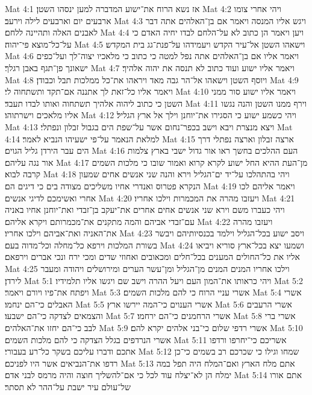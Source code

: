 Mat 4:1  אז נשא הרוח את־ישוע המדברה למען ינסהו השטן׃
Mat 4:2  ויהי אחרי צומו ארבעים יום וארבעים לילה וירעב׃
Mat 4:3  ויגש אליו המנסה ויאמר אם בן־האלהים אתה דבר לאבנים האלה ותהיינה ללחם׃
Mat 4:4  ויען ויאמר הן כתוב לא על־הלחם לבדו יחיה האדם כי על־כל־מוצא פי־יהוה׃
Mat 4:5  וישאהו השטן אל־עיר הקדש ויעמידהו על־פנת־גג בית המקדש׃
Mat 4:6  ויאמר אליו אם בן־האלהים אתה נפל למטה כי כתוב כי מלאכיו יצוה־לך ועל־כפים ישאונך פן־תגף באבן רגלך׃
Mat 4:7  ויאמר אליו ישוע ועוד כתוב לא תנסה את יהוה אלהיך׃
Mat 4:8  ויוסף השטן וישאהו אל־הר גבה מאד ויראהו את־כל ממלכות תבל וכבודן׃
Mat 4:9  ויאמר אליו כל־זאת לך אתננה אם־תקד ותשתחוה לי׃
Mat 4:10  ויאמר אליו ישוע סור ממני השטן כי כתוב ליהוה אלהיך תשתחוה ואותו לבדו תעבד׃
Mat 4:11  וירף ממנו השטן והנה נגשו אליו מלאכים וישרתוהו׃
Mat 4:12  ויהי כשמע ישוע כי הסגירו את־יוחנן וילך אל ארץ הגליל׃
Mat 4:13  ויצא מנצרת ויבא וישב בכפר־נחום אשר על־שפת הים בגבול זבלון ונפתלי׃
Mat 4:14  למלאת הנאמר על־פי ישעיהו הנביא לאמר׃
Mat 4:15  ארצה זבלון וארצה נפתלי דרך הים עבר הירדן גליל הגוים׃
Mat 4:16  העם ההלכים בחשך ראו אור גדול ישבי בארץ צלמות אור נגה עליהם׃
Mat 4:17  מן־העת ההיא החל ישוע לקרא קרוא ואמור שובו כי מלכות השמים קרבה לבוא׃
Mat 4:18  ויהי בהתהלכו על־יד ים־הגליל וירא והנה שני אנשים אחים שמעון הנקרא פטרוס ואנדרי אחיו משליכים מצודה בים כי דיגים הם׃
Mat 4:19  ויאמר אליהם לכו אחרי ואשימכם לדיגי אנשים׃
Mat 4:20  ויעזבו מהרה את המכמרות וילכו אחריו׃
Mat 4:21  ויהי כעברו משם וירא שני אנשים אחים אחרים את־יעקב בן־זבדי ואת־יוחנן אחיו באניה עם־זבדי אביהם והמה מתקנים את־מכמרותם ויקרא אליהם׃
Mat 4:22  ויעזבו מהרה את־האניה ואת־אביהם וילכו אחריו׃
Mat 4:23  ויסב ישוע בכל־הגליל וילמד בכנסיותיהם ויבשר בשורת המלכות וירפא כל־מחלה וכל־מדוה בעם׃
Mat 4:24  ושמעו יצא בכל־ארץ סוריא ויביאו אליו את כל־החולים המענים בכל־חלים ומכאובים ואחוזי שדים ומכי ירח ונכי אברים וירפאם׃
Mat 4:25  וילכו אחריו המנים המנים מן־הגליל ומן־עשר הערים ומירושלים ויהודה ומעבר לירדן׃
Mat 5:1  ויהי כראותו את־המון העם ויעל ההרה וישב שם ויגשו אליו תלמידיו׃
Mat 5:2  ויפתח את־פיו ויורם ויאמר׃
Mat 5:3  אשרי עניי הרוח כי להם מלכות השמים׃
Mat 5:4  אשרי האבלים כי־הם ינחמו׃
Mat 5:5  אשרי הענוים כי־המה יירשו ארץ׃
Mat 5:6  אשרי הרעבים והצמאים לצדקה כי־הם ישבעו׃
Mat 5:7  אשרי הרחמנים כי־הם ירחמו׃
Mat 5:8  אשרי ברי לבב כי־הם יחזו את־האלהים׃
Mat 5:9  אשרי רדפי שלום כי־בני אלהים יקרא להם׃
Mat 5:10  אשרי הנרדפים בגלל הצדקה כי להם מלכות השמים׃
Mat 5:11  אשריכם כי־יחרפו ורדפו אתכם ודברו עליכם בשקר כל־רע בעבורי׃
Mat 5:12  שמחו וגילו כי שכרכם רב בשמים כי־כן רדפו את־הנביאים אשר היו לפניכם׃
Mat 5:13  אתם מלח הארץ ואם־המלח היה תפל במה ימלח הן לא־יצלח עוד לכל כי אם־להשליך חוצה והיה מרמס לבני אדם׃
Mat 5:14  אתם אורו של־עולם עיר ישבת על־ההר לא תסתר׃
